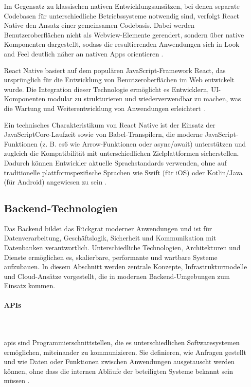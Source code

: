 Im Gegensatz zu klassischen nativen Entwicklungsansätzen, bei denen separate Codebasen für unterschiedliche Betriebssysteme notwendig sind, verfolgt React Native den Ansatz einer gemeinsamen Codebasis. Dabei werden Benutzeroberflächen nicht als Webview-Elemente gerendert, sondern über native Komponenten dargestellt, sodass die resultierenden Anwendungen sich in Look and Feel deutlich näher an nativen Apps orientieren \cite{brainhub_react_native}.

React Native basiert auf dem populären JavaScript-Framework React, das ursprünglich für die Entwicklung von Benutzeroberflächen im Web entwickelt wurde. Die Integration dieser Technologie ermöglicht es Entwicklern, UI-Komponenten modular zu strukturieren und wiederverwendbar zu machen, was die Wartung und Weiterentwicklung von Anwendungen erleichtert \cite{brainhub_react_native}.

Ein technisches Charakteristikum von React Native ist der Einsatz der JavaScriptCore-Laufzeit sowie von Babel-Transpilern, die moderne JavaScript-Funktionen (z. B. \gls{es6} wie Arrow-Funktionen oder async/await) unterstützen und zugleich die Kompatibilität mit unterschiedlichen Zielplattformen sicherstellen. Dadurch können Entwickler aktuelle Sprachstandards verwenden, ohne auf traditionelle plattformspezifische Sprachen wie Swift (für iOS) oder Kotlin/Java (für Android) angewiesen zu sein \cite{brainhub_react_native}.


\subsection{Backend-Technologien}

Das Backend bildet das Rückgrat moderner Anwendungen und ist für Datenverarbeitung, Geschäftslogik, Sicherheit und Kommunikation mit Datenbanken verantwortlich. Unterschiedliche Technologien, Architekturen und Dienste ermöglichen es, skalierbare, performante und wartbare Systeme aufzubauen. In diesem Abschnitt werden zentrale Konzepte, Infrastrukturmodelle und Cloud-Ansätze vorgestellt, die in modernen Backend-Umgebungen zum Einsatz kommen.

\paragraph{APIs}
\mbox{}\\
\mbox{}\\
\acrlong{apis} sind Programmierschnittstellen, die es unterschiedlichen Softwaresystemen ermöglichen, miteinander zu kommunizieren. Sie definieren, wie Anfragen gestellt und wie Daten oder Funktionen zwischen Anwendungen ausgetauscht werden können, ohne dass die internen Abläufe der beteiligten Systeme bekannt sein müssen \cite{talend_api_definition}.

